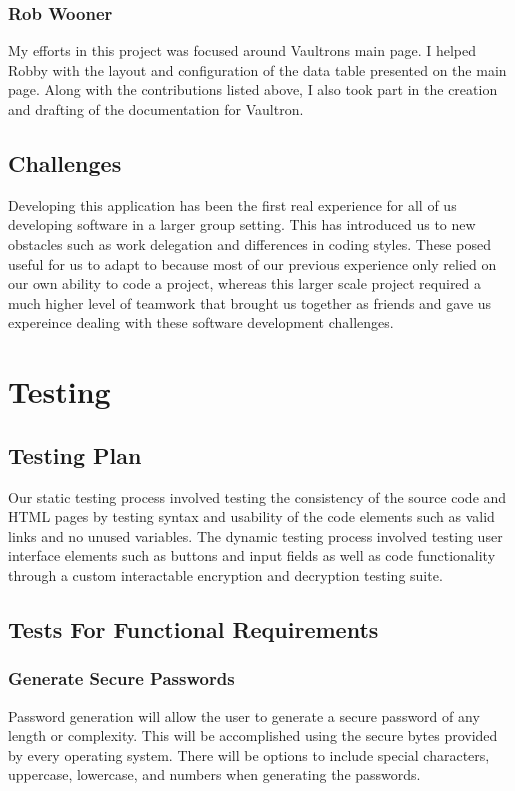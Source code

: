\documentclass[11pt]{report}
\begin{document}
\subsection{Rob Wooner}
My efforts in this project was focused around Vaultrons main page. I helped
Robby with the layout and configuration of the data table presented on the main
page. Along with the contributions listed above, I also took part in the creation 
and drafting of the documentation for Vaultron.



\section{Challenges}
Developing this application has been the first real experience for all of us
developing software in a larger group setting. This has introduced us to new
obstacles such as work delegation and differences in coding styles. These posed
useful for us to adapt to because most of our previous experience only relied
on our own ability to code a project, whereas this larger scale project 
required a much higher level of teamwork that brought us together as friends
and gave us expereince dealing with these software development challenges.




\chapter{Testing}

\section{Testing Plan}
Our static testing process involved testing the consistency of the source code 
and HTML pages by testing syntax and usability of the code elements such as 
valid links and no unused variables. The dynamic testing process involved
testing user interface elements such as buttons and input fields as well as 
code functionality through a custom interactable encryption and decryption
testing suite.


\section{Tests For Functional Requirements}

\subsection{Generate Secure Passwords}
Password generation will allow the user to generate a secure password of any length or 
complexity. This will be accomplished using the secure bytes provided by every
operating system. There will be options to include special characters, uppercase,
lowercase, and numbers when generating the passwords.
\end{document}
